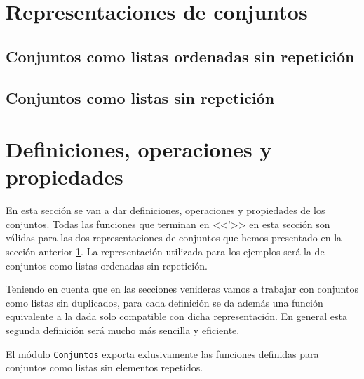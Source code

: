 \section{Representaciones de conjuntos}

\label{sec:rep_conjuntos}

\subsection{Conjuntos como listas ordenadas sin repetición}


\subsection{Conjuntos como listas sin repetición}


\section{Definiciones, operaciones y propiedades}

En esta sección se van a dar definiciones, operaciones y propiedades
de los conjuntos. Todas las funciones que terminan en <<'>> en esta 
sección son válidas para las dos representaciones de conjuntos que     
hemos presentado en la sección anterior \ref{sec:rep_conjuntos}.
La representación utilizada para los ejemplos será la de conjuntos
como listas ordenadas sin repetición.

Teniendo en cuenta que en las secciones venideras vamos a trabajar con         
conjuntos como listas sin duplicados, para cada definición se da además
una función equivalente a la dada solo compatible con dicha representación.
En general esta segunda definición será mucho más sencilla y eficiente.

\begin{nota}
El módulo \texttt{Conjuntos} exporta exlusivamente las funciones definidas   
para conjuntos como listas sin elementos repetidos. 
\end{nota}

